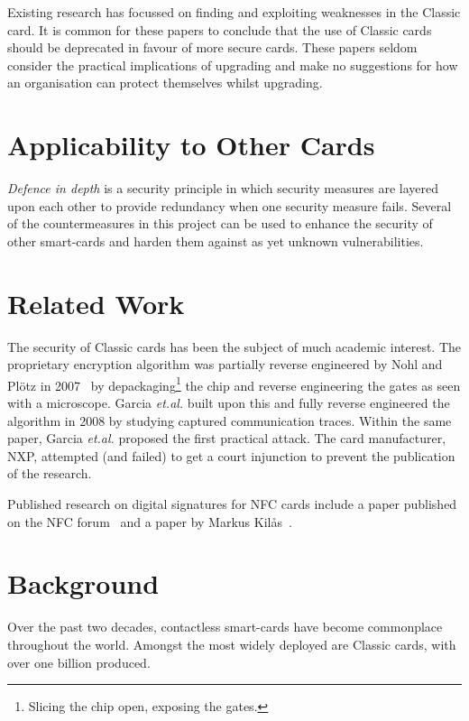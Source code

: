 \documentclass[final,dissertation.tex]{subfiles}
\begin{document}
  Existing research\cite{garcia2008dismantling}\cite{garcia2009wirelessly}\cite{courtois2008algebraic} has focussed on finding and exploiting weaknesses in the \mifare{} Classic card. It is common for these papers to conclude that the use of \mifare{} Classic cards should be deprecated in favour of more secure cards. These papers seldom consider the practical implications of upgrading and make no suggestions for how an organisation can protect themselves whilst upgrading.

  \section{Applicability to Other Cards}

  \emph{Defence in depth} is a security principle in which security measures are layered upon each other to provide redundancy when one security measure fails. Several of the countermeasures in this project can be used to enhance the security of other smart-cards and harden them against as yet unknown vulnerabilities.

  \section{Related Work}

  The security of \mifare{} Classic cards has been the subject of much academic interest. The proprietary encryption algorithm \crypto{} was partially reverse engineered by Nohl and Pl\"{o}tz in 2007~\cite{nohl:2007:ccc} by depackaging\footnote{Slicing the chip open, exposing the gates.} the chip and reverse engineering the gates as seen with a microscope. Garcia \emph{et.al.} built upon this and fully reverse engineered the algorithm in 2008\cite{garcia2008dismantling} by studying captured communication traces. Within the same paper, Garcia \emph{et.al.} proposed the first practical attack. The card manufacturer, NXP, attempted (and failed) to get a court injunction to prevent the publication of the research.

  Published research on digital signatures for NFC cards include a paper published on the NFC forum~\cite{rosati:2011:signatures} and a paper by Markus Kil\r{a}s~\cite{kilas:2009:signatures}.


  \section{Background}

  Over the past two decades, contactless smart-cards have become commonplace throughout the world. Amongst the most widely deployed are \mifare{} Classic cards, with over one billion produced.
\end{document}

